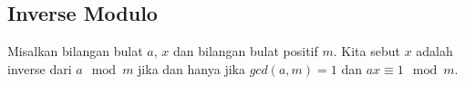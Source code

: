 \subsection{Inverse Modulo}
Misalkan bilangan bulat $a$, $x$ dan bilangan bulat positif $m$. Kita sebut $x$ adalah inverse dari $a \mod m$ jika dan hanya jika $gcd(a,m)=1$ dan $ax \equiv 1 \mod m$.